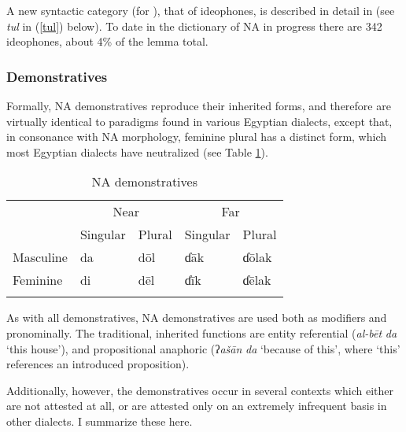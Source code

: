 \documentclass[output=paper]{langsci/langscibook}
\begin{document}
A new syntactic category (for ), that of {ideophones}, is described in detail in \citet{OwensHassan2004} (see \textit{tul} in (\ref{tul}) below). To date in the dictionary of NA in progress there are 342 {ideophones}, about 4\% of the lemma total.

\subsubsection{Demonstratives} \label{demons}

Formally, NA {demonstratives} reproduce their inherited forms, and therefore are virtually identical to paradigms found in various Egyptian dialects, except that, in consonance with NA morphology, feminine plural has a distinct form, which most Egyptian dialects have neutralized (see Table \ref{demtab}).

\begin{table}

\begin{tabular}{lllll}
\lsptoprule
     & \multicolumn{2}{c}{Near}       & \multicolumn{2}{c}{Far} \\\cmidrule(lr){2-3}\cmidrule(lr){4-5}
& Singular &  Plural & Singular & Plural\\
\midrule
Masculine & da & dōl & ɗāk & ɗōlak\\
Feminine & di & dēl & ɗīk & ɗēlak\\
\lspbottomrule
\end{tabular}
\caption{\label{bkm:Ref520909612}NA demonstratives}
\label{demtab}
\end{table}

As with all  {demonstratives}, NA {demonstratives} are used both as modifiers and pronominally. The traditional, inherited functions are entity referential (\textit{al-bēt} \textit{da} ‘this house’), and propositional anaphoric (ʔ\textit{ašān} \textit{da} ‘because of this’, where ‘this’ references an introduced proposition).

Additionally, however, the {demonstratives} occur in several contexts which either are not attested at all, or are attested only on an extremely infrequent basis in other  dialects. I summarize these here.
\end{document}
